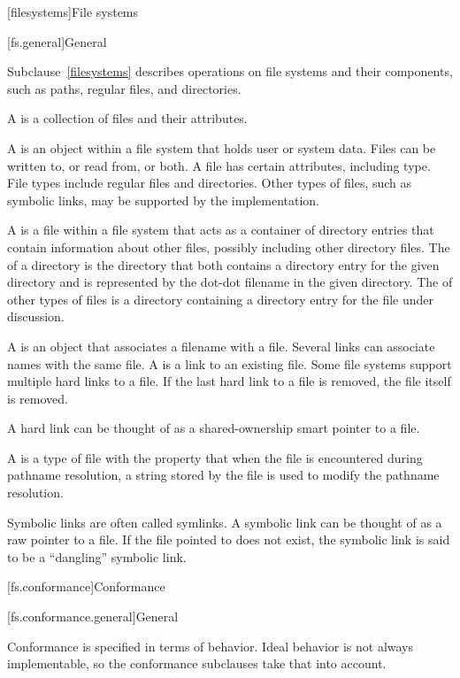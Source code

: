 [filesystems]{File systems}

[fs.general]{General}

\pnum
Subclause~\ref{filesystems} describes operations on file systems and their components, such as paths,
regular files, and directories.

\pnum
A  is
a collection of files and their attributes.

\pnum
A  is
an object within a file system that holds user or system data. Files can be written to, or read from, or both. A file
has certain attributes, including type. File types include regular files
and directories. Other types of files, such as symbolic links,
may be supported by the implementation.

\pnum
A  is
a file within a file system that acts as a container of directory entries
that contain information about
other files, possibly including other directory files.
The  of a directory is
the directory that both contains a
directory entry for the given directory and is represented by the dot-dot
filename in the given directory.
The 
of other types of files is a directory containing a directory
entry for the file under discussion.

\pnum
A  is
an object that associates a filename with a file. Several links can associate names with the same file.
A  is
a link to an existing file. Some
file systems support multiple hard links to a file. If the last hard link to a
file is removed, the file itself is removed.
\begin{note}
A hard link can be thought of as a shared-ownership smart
pointer to a file.
\end{note}
A  is
a type of file with the
property that when the file is encountered during pathname resolution, a string
stored by the file is used to modify the pathname resolution.
\begin{note}
Symbolic links are often called symlinks. A symbolic link can be thought of as a raw pointer to a file.
If the file pointed to does not exist, the symbolic link is said to be a
``dangling'' symbolic link.
\end{note}

[fs.conformance]{Conformance}

[fs.conformance.general]{General}

\pnum
Conformance is specified in terms of behavior. Ideal behavior is not always
implementable, so the conformance subclauses take that into account.

